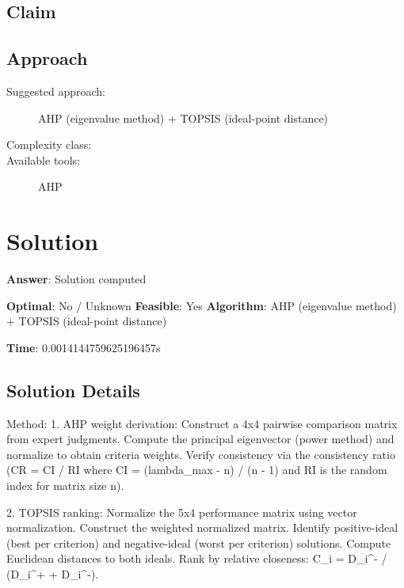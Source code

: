 \documentclass[11pt, a4paper]{article}
\begin{document}
\subsection{Claim}


\subsection{Approach}

\begin{description}
  \item[Suggested approach:] AHP (eigenvalue method) + TOPSIS (ideal-point distance)
  \item[Complexity class:] 
  \item[Available tools:] AHP
\end{description}
\section{Solution}

\begin{polyaresult}

\textbf{Answer}: Solution computed


\textbf{Optimal}: No / Unknown \hfill
\textbf{Feasible}: Yes
\textbf{Algorithm}: AHP (eigenvalue method) + TOPSIS (ideal-point distance) \quad $$

\textbf{Time}: 0.0014144759625196457s


\end{polyaresult}

\subsection{Solution Details}


Method: 1. AHP weight derivation: Construct a 4x4 pairwise comparison matrix from expert judgments. Compute the principal eigenvector (power method) and normalize to obtain criteria weights. Verify consistency via the consistency ratio (CR = CI / RI where CI = (lambda\_max - n) / (n - 1) and RI is the random index for matrix size n).

2. TOPSIS ranking: Normalize the 5x4 performance matrix using vector normalization. Construct the weighted normalized matrix. Identify positive-ideal (best per criterion) and negative-ideal (worst per criterion) solutions. Compute Euclidean distances to both ideals. Rank by relative closeness: C\_i = D\_i\textasciicircum{}- / (D\_i\textasciicircum{}+ + D\_i\textasciicircum{}-).
\end{document}
